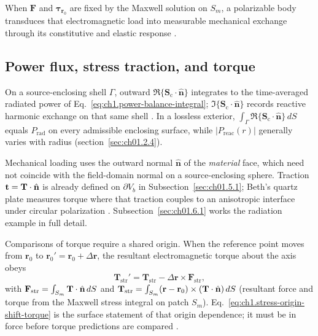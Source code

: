 When $\mathbf{F}$ and $\boldsymbol{\tau}_{\mathbf{r}_0}$ are fixed by the Maxwell solution on $S_m$, a polarizable body transduces that electromagnetic load into measurable mechanical exchange through its constitutive and elastic response \cite{beth1936,stratton1941}.

\subsection{Power flux, stress traction, and torque}
\label{sec:ch01.5.2}

On a source-enclosing shell $\Gamma$, outward $\Re\{\mathbf{S}_\mathrm{c}\cdot\hat{\mathbf{n}}\}$ integrates to the time-averaged radiated power of Eq.~\eqref{eq:ch1.power-balance-integral}; $\Im\{\mathbf{S}_\mathrm{c}\cdot\hat{\mathbf{n}}\}$ records reactive harmonic exchange on that same shell \cite{poynting1884,stratton1941}. In a lossless exterior, $\int_{\Gamma}\Re\{\mathbf{S}_\mathrm{c}\cdot\hat{\mathbf{n}}\}\,dS$ equals $P_{\mathrm{rad}}$ on every admissible enclosing surface, while $|P_{\mathrm{reac}}(r)|$ generally varies with radius (section~\ref{sec:ch01.2.4}).

Mechanical loading uses the outward normal $\hat{\mathbf{n}}$ of the \emph{material} face, which need not coincide with the field-domain normal on a source-enclosing sphere. Traction $\mathbf{t}=\mathbf{T}\cdot\hat{\mathbf{n}}$ is already defined on $\partial V_b$ in Subsection~\ref{sec:ch01.5.1}; Beth's quartz plate measures torque where that traction couples to an anisotropic interface under circular polarization \cite{beth1936,stratton1941}. Subsection~\ref{sec:ch01.6.1} works the radiation example in full detail.

Comparisons of torque require a shared origin. When the reference point moves from $\mathbf{r}_0$ to $\mathbf{r}_0'=\mathbf{r}_0+\Delta\mathbf{r}$, the resultant electromagnetic torque about the axis obeys
\begin{equation}
\label{eq:ch1.stress-origin-shift-torque}
\mathbf{T}_{\mathrm{str}}'
=
\mathbf{T}_{\mathrm{str}}-\Delta\mathbf{r}\times\mathbf{F}_{\mathrm{str}},
\end{equation}
with $\mathbf{F}_{\mathrm{str}}=\int_{S_m}\mathbf{T}\cdot\hat{\mathbf{n}}\,dS$ and $\mathbf{T}_{\mathrm{str}}=\int_{S_m}(\mathbf{r}-\mathbf{r}_0)\times(\mathbf{T}\cdot\hat{\mathbf{n}})\,dS$ (resultant force and torque from the Maxwell stress integral on patch $S_m$).
Eq.~\eqref{eq:ch1.stress-origin-shift-torque} is the surface statement of that origin dependence; it must be in force before torque predictions are compared \cite{stratton1941}.

